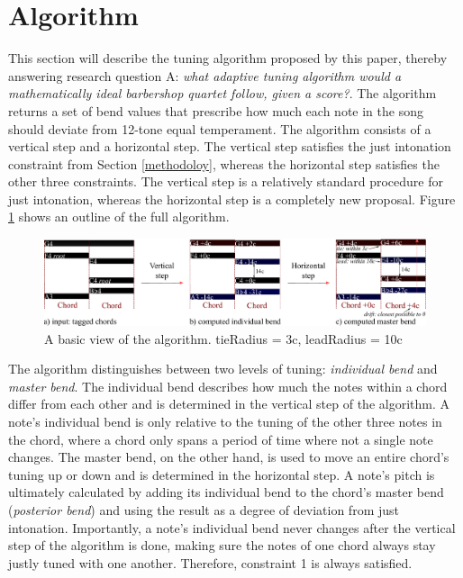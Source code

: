\documentclass[a4paper]{article}
\begin{document}
\section{Algorithm}
\label{algorithm}
This section will describe the tuning algorithm proposed by this paper, thereby answering research question A: {\it what adaptive tuning algorithm would a mathematically ideal barbershop quartet follow, given a score?}. The algorithm returns a set of bend values that prescribe how much each note in the song should deviate from 12-tone equal temperament. The algorithm consists of a vertical step and a horizontal step. The vertical step satisfies the just intonation constraint from Section \ref{methodoloy}, whereas the horizontal step satisfies the other three constraints. The vertical step is a relatively standard procedure for just intonation, whereas the horizontal step is a completely new proposal. Figure \ref{fig:algo_outline} shows an outline of the full algorithm.

\begin{figure}
	\includegraphics[scale=0.35]{Figures/algo_outline.pdf}
	\caption{A basic view of the algorithm. tieRadius = 3c, leadRadius = 10c}
	\label{fig:algo_outline}
\end{figure}

The algorithm distinguishes between two levels of tuning: \textit{individual bend} and \textit{master bend}. The individual bend describes how much the notes within a chord differ from each other and is determined in the vertical step of the algorithm. A note's individual bend is only relative to the tuning of the other three notes in the chord, where a chord only spans a period of time where not a single note changes. The master bend, on the other hand, is used to move an entire chord's tuning up or down and is determined in the horizontal step. A note's pitch is ultimately calculated by adding its individual bend to the chord's master bend (\textit{posterior bend}) and using the result as a degree of deviation from just intonation. Importantly, a note's individual bend never changes after the vertical step of the algorithm is done, making sure the notes of one chord always stay justly tuned with one another. Therefore, constraint 1 is always satisfied.
\end{document}
